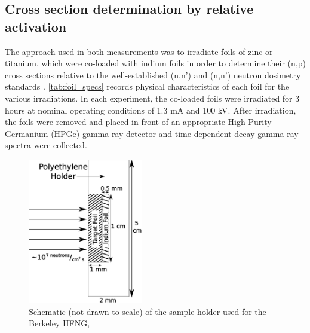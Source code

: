 \documentclass[5p]{elsarticle}
\begin{document}
\subsection{Cross section determination by relative activation}\label{sec:sample_loading}


The approach used in both measurements was to irradiate foils of zinc or titanium, which were co-loaded with indium foils in order to determine their (n,p) cross sections relative to the well-established (n,n') and (n,n') neutron dosimetry standards \cite{Capote2012,zsolnay2012technical}.
  \autoref{tab:foil_specs} records physical characteristics of each foil for the various irradiations.
In each experiment, the co-loaded foils were irradiated for 3 hours at nominal operating conditions of 1.3 mA and 100 kV.
 After irradiation, the foils were removed and placed in front of an appropriate High-Purity Germanium (HPGe) gamma-ray detector and time-dependent decay gamma-ray spectra were collected.
  



\begin{figure}
    \centering
        \includegraphics[height=2.5in]{./figures/holder.pdf}
        \caption{Schematic (not drawn to scale) of the sample holder used for the Berkeley HFNG,}
        \label{fig:holder_a}
\end{figure}
\end{document}

